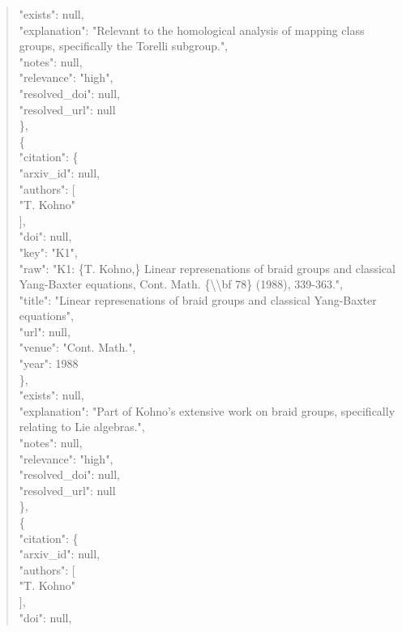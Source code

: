 \documentclass[11pt]{article}
\begin{document}
\begin{quote}
      "exists": null,\\
      "explanation": "Relevant to the homological analysis of mapping class groups, specifically the Torelli subgroup.",\\
      "notes": null,\\
      "relevance": "high",\\
      "resolved\_doi": null,\\
      "resolved\_url": null\\
    \},\\
    \{\\
      "citation": \{\\
        "arxiv\_id": null,\\
        "authors": [\\
          "T. Kohno"\\
        ],\\
        "doi": null,\\
        "key": "K1",\\
        "raw": "K1: \{T. Kohno,\} Linear represenations of braid groups and classical Yang-Baxter equations, Cont. Math. \{\textbackslash{}\textbackslash{}bf 78\} (1988), 339-363.",\\
        "title": "Linear represenations of braid groups and classical Yang-Baxter equations",\\
        "url": null,\\
        "venue": "Cont. Math.",\\
        "year": 1988\\
      \},\\
      "exists": null,\\
      "explanation": "Part of Kohno's extensive work on braid groups, specifically relating to Lie algebras.",\\
      "notes": null,\\
      "relevance": "high",\\
      "resolved\_doi": null,\\
      "resolved\_url": null\\
    \},\\
    \{\\
      "citation": \{\\
        "arxiv\_id": null,\\
        "authors": [\\
          "T. Kohno"\\
        ],\\
        "doi": null,\\

\end{quote}
\end{document}

